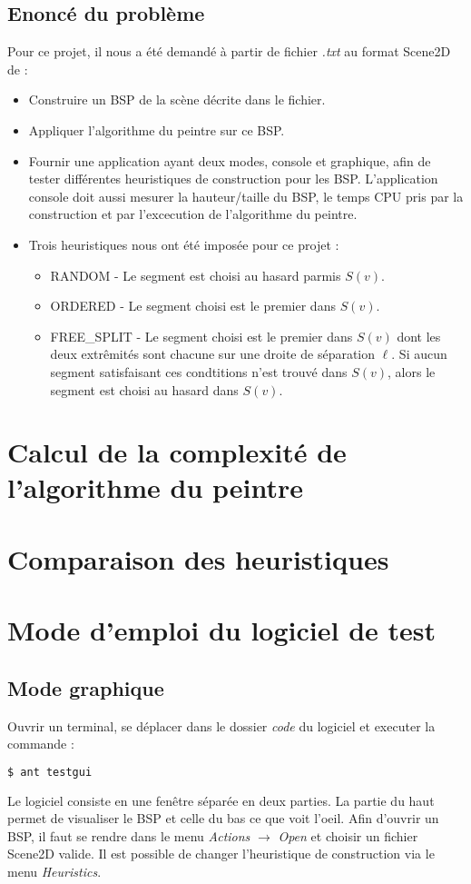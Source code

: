 \documentclass[11pts]{article}
\begin{document}
\subsection{Enoncé du problème}
Pour ce projet, il nous a été demandé à partir de fichier \emph{.txt} au format Scene2D de :
\begin{itemize}
\item Construire un BSP de la scène décrite dans le fichier.
\item Appliquer l'algorithme du peintre sur ce BSP.
\item Fournir une application ayant deux modes, console et graphique, afin de tester différentes heuristiques de construction pour les BSP. L'application console doit aussi mesurer la hauteur/taille du BSP, le temps CPU pris par la construction et par l'excecution de l'algorithme du peintre.
\item Trois heuristiques nous ont été imposée pour ce projet :
\begin{itemize}
\item RANDOM - Le segment est choisi au hasard parmis $S(v)$.
\item ORDERED - Le segment choisi est le premier dans $S(v)$.
\item FREE\_SPLIT - Le segment choisi est le premier dans $S(v)$ dont les deux extrêmités sont chacune sur une droite de séparation $\ell$. Si aucun segment satisfaisant ces condtitions n'est trouvé dans $S(v)$, alors le segment est choisi au hasard dans $S(v)$.
\end{itemize}
\end{itemize}

\newpage
\section{Calcul de la complexité de l'algorithme du peintre}


\newpage
\section{Comparaison des heuristiques}


\newpage
\section{Mode d'emploi du logiciel de test}
\subsection*{Mode graphique}
Ouvrir un terminal, se déplacer dans le dossier \emph{code} du logiciel et executer la commande :
\begin{lstlisting}[language=bash]
$ ant testgui
\end{lstlisting}
Le logiciel consiste en une fenêtre séparée en deux parties. La partie du haut permet de visualiser le BSP et celle du bas ce que voit l'oeil.
Afin d'ouvrir un BSP, il faut se rendre dans le menu \emph{Actions} $\rightarrow$ \emph{Open} et choisir un fichier Scene2D valide.
Il est possible de changer l'heuristique de construction via le menu \emph{Heuristics}.
\end{document}
